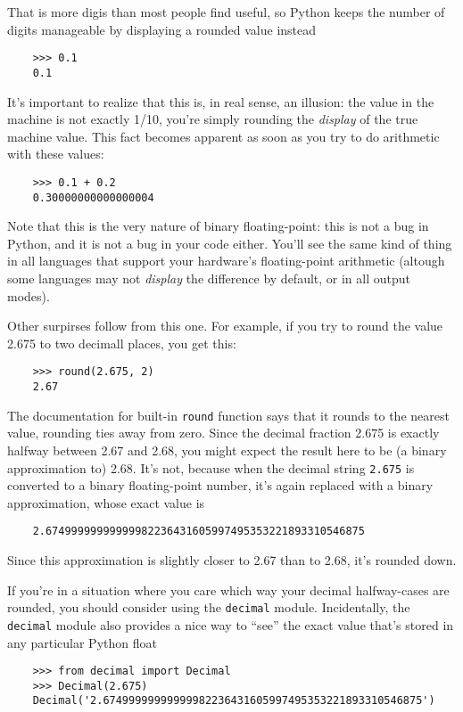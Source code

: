 \documentclass[UTF8]{article}
\begin{document}
That is more digis than most people find useful, so Python keeps the number of digits manageable by
displaying a rounded value instead
\begin{verbatim}
    >>> 0.1
    0.1
\end{verbatim}

It's important to realize that this is, in real sense, an illusion: the value in the machine is not
exactly 1/10, you're simply rounding the \emph{display} of the true machine value. This fact
becomes apparent as soon as you try to do arithmetic with these values:
\begin{verbatim}
    >>> 0.1 + 0.2
    0.30000000000000004
\end{verbatim}

Note that this is the very nature of binary floating-point: this is not a bug in Python, and it is
not a bug in your code either. You'll see the same kind of thing in all languages that support your
hardware's floating-point arithmetic (altough some languages may not \emph{display} the difference
by default, or in all output modes).

Other surpirses follow from this one. For example, if you try to round the value 2.675 to two
decimall places, you get this:
\begin{verbatim}
    >>> round(2.675, 2)
    2.67
\end{verbatim}

The documentation for built-in \texttt{round} function says that it rounds to the nearest value,
rounding ties away from zero. Since the decimal fraction 2.675 is exactly halfway between 2.67 and
2.68, you might expect the result here to be (a binary approximation to) 2.68. It's not, because
when the decimal string \texttt{2.675} is converted to a binary floating-point number, it's again
replaced with a binary approximation, whose exact value is
\begin{verbatim}
    2.67499999999999982236431605997495353221893310546875
\end{verbatim}

Since this approximation is slightly closer to 2.67 than to 2.68, it's rounded down.

If you're in a situation where you care which way your decimal halfway-cases are rounded,
you should consider using the \texttt{decimal} module. Incidentally, the \texttt{decimal} module
also provides a nice way to ``see'' the exact value that's stored in any particular Python float
\begin{verbatim}
    >>> from decimal import Decimal
    >>> Decimal(2.675)
    Decimal('2.67499999999999982236431605997495353221893310546875')
\end{verbatim}
\end{document}

